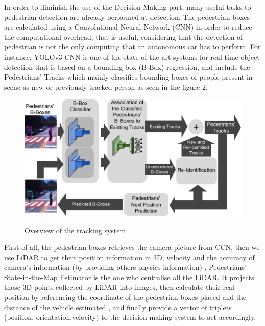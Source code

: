 \smallskip
In order to diminish the use of the Decision-Making part, many useful tasks to pedestrian detection are already performed at detection. The pedestrian boxes are calculated using a Convolutional Neural Network (CNN) in order to reduce the computational overhead, that is useful, considering that the detection of pedestrian is not the only computing that an autonomous car has to perform. For instance, YOLOv3 CNN \cite{redmon_yolov3:_2018} is one of the state-of-the-art systems for real-time object detection that is based on a bounding box (B-Box) regression, and include the Pedestrians’ Tracks which mainly classifies bounding-boxes of people present in scene as new or previously tracked person as seen in the figure 2.
\begin{center}
    \begin{figure}[ht!]
        \centering
        
        \includegraphics[width=467px, keepaspectratio]{imports/pedestrian2.jpg}
              \caption{Overview of the tracking system}
              \cite{sarcinelli_handling_2019}
    \end{figure}
\end{center}
First of all, the pedestrian boxes retrieves the camera picture from CCN, then we use LiDAR to get their position information in 3D, velocity and the accuracy of camera’s information (by providing others physics information) \cite{guidolini_handling_2018}. Pedestrians’ State-in-the-Map Estimator is the one who centralise all the LiDAR. It projects those 3D points collected by LiDAR into images, then calculate their real position by referencing the coordinate of the pedestrian boxes placed and the distance of the vehicle estimated , and finally provide a vector of triplets (position, orientation,velocity) to the decision making system to act accordingly.  
\smallskip

